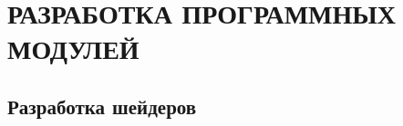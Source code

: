 \section{РАЗРАБОТКА ПРОГРАММНЫХ МОДУЛЕЙ}
\label{sec:dev}

\subsection{Разработка шейдеров}
\label{sub:dev:shader}
